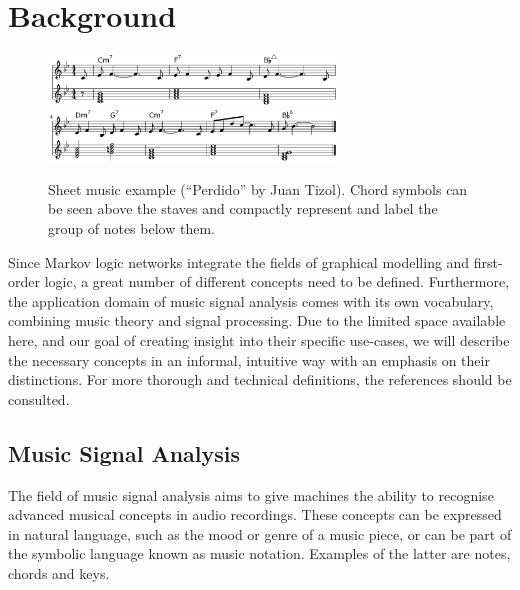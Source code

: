 \documentclass[letterpaper]{article} %
\begin{document}
\section{Background}

\begin{figure}[t]
\centering
\includegraphics[width=0.68\textwidth]{perdido1}
\includegraphics[width=0.68\textwidth]{perdido2}
\caption{Sheet music example (``Perdido'' by Juan Tizol). Chord symbols can be seen above the staves and compactly represent and label the group of notes below them.\label{fig:sheet-music}}
\end{figure}

Since Markov logic networks integrate the fields of graphical modelling and first-order logic, a great number of different concepts need to be defined. Furthermore, the application domain of music signal analysis comes with its own vocabulary, combining music theory and signal processing. Due to the limited space available here, and our goal of creating insight into their specific use-cases, we will describe the necessary concepts in an informal, intuitive way with an emphasis on their distinctions. For more thorough and technical definitions, the references should be consulted.

\subsection{Music Signal Analysis}

The field of music signal analysis aims to give machines the ability to recognise advanced musical concepts in audio recordings. These concepts can be expressed in natural language, such as the mood or genre of a music piece, or can be part of the symbolic language known as music notation.
Examples of the latter are notes, chords and keys.
\end{document}
